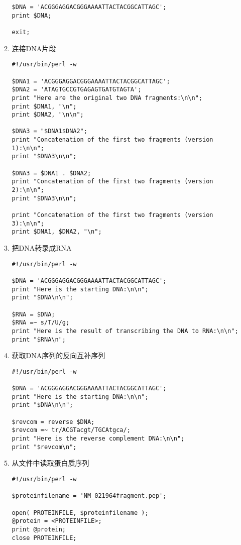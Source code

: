 \documentclass{TIJMUjiaoanSY}
\begin{document}
\begin{enumerate}
\begin{enumerate}
\begin{verbatim}
$DNA = 'ACGGGAGGACGGGAAAATTACTACGGCATTAGC';
print $DNA;

exit;
\end{verbatim}
      \item 连接DNA片段
\begin{verbatim}
#!/usr/bin/perl -w

$DNA1 = 'ACGGGAGGACGGGAAAATTACTACGGCATTAGC';
$DNA2 = 'ATAGTGCCGTGAGAGTGATGTAGTA';
print "Here are the original two DNA fragments:\n\n";
print $DNA1, "\n";
print $DNA2, "\n\n";

$DNA3 = "$DNA1$DNA2";
print "Concatenation of the first two fragments (version 1):\n\n";
print "$DNA3\n\n";

$DNA3 = $DNA1 . $DNA2;
print "Concatenation of the first two fragments (version 2):\n\n";
print "$DNA3\n\n";

print "Concatenation of the first two fragments (version 3):\n\n";
print $DNA1, $DNA2, "\n";
\end{verbatim}
      \item 把DNA转录成RNA
\begin{verbatim}
#!/usr/bin/perl -w

$DNA = 'ACGGGAGGACGGGAAAATTACTACGGCATTAGC';
print "Here is the starting DNA:\n\n";
print "$DNA\n\n";

$RNA = $DNA;
$RNA =~ s/T/U/g;
print "Here is the result of transcribing the DNA to RNA:\n\n";
print "$RNA\n";
\end{verbatim}

\otherTail
\newpage
\otherHeader

      \item 获取DNA序列的反向互补序列
\begin{verbatim}
#!/usr/bin/perl -w

$DNA = 'ACGGGAGGACGGGAAAATTACTACGGCATTAGC';
print "Here is the starting DNA:\n\n";
print "$DNA\n\n";

$revcom = reverse $DNA;
$revcom =~ tr/ACGTacgt/TGCAtgca/;
print "Here is the reverse complement DNA:\n\n";
print "$revcom\n";
\end{verbatim}
      \item 从文件中读取蛋白质序列
\begin{verbatim}
#!/usr/bin/perl -w

$proteinfilename = 'NM_021964fragment.pep';

open( PROTEINFILE, $proteinfilename );
@protein = <PROTEINFILE>;
print @protein;
close PROTEINFILE;
\end{verbatim}
    \end{enumerate}
\end{enumerate}

\otherTail
\end{document}
